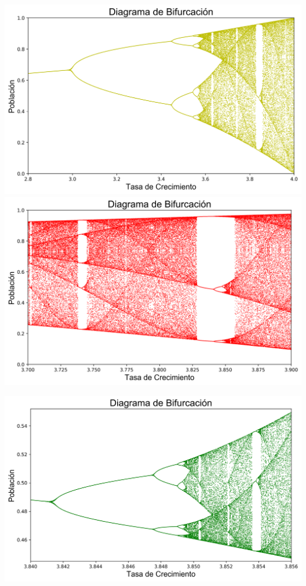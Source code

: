 \documentclass[11pt]{article}
\begin{document}
\includegraphics[scale=0.37]{logistic-map-bifurcation-2.png} \hspace{0.01cm} \includegraphics[scale=0.37]{logistic-map-bifurcation-3.png}


\begin{center}
\includegraphics[scale=0.50]{logistic-map-bifurcation-4.png}
\end{center}
\end{document}
